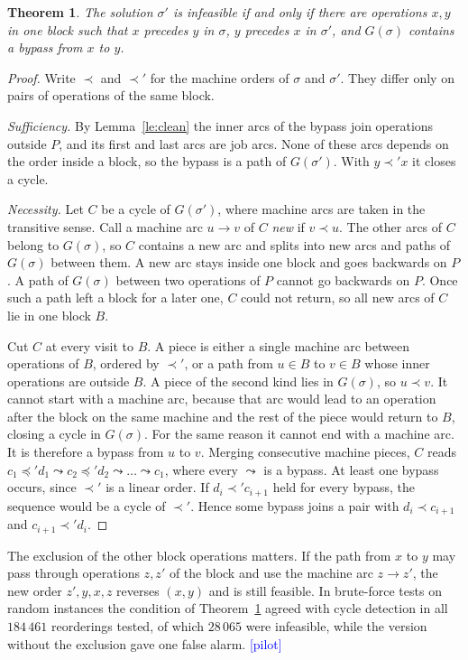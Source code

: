 \documentclass[10pt,twocolumn]{article}
\newtheorem{theorem}{Theorem}
\newcommand{\pilot}{\textcolor{blue}{[pilot]}}
\begin{document}
\begin{theorem}\label{th:main}
The solution $\sigma'$ is infeasible if and only if there are operations
$x,y$ in one block such that $x$ precedes $y$ in $\sigma$, $y$ precedes
$x$ in $\sigma'$, and $G(\sigma)$ contains a bypass from $x$ to $y$.
\end{theorem}
\begin{proof}
Write $\prec$ and $\prec'$ for the machine orders of $\sigma$ and
$\sigma'$. They differ only on pairs of operations of the same block.

\emph{Sufficiency.} By Lemma~\ref{le:clean} the inner arcs of the bypass
join operations outside $P$, and its first and last arcs are job arcs.
None of these arcs depends on the order inside a block, so the bypass is a
path of $G(\sigma')$. With $y\prec' x$ it closes a cycle.

\emph{Necessity.} Let $C$ be a cycle of $G(\sigma')$, where machine arcs
are taken in the transitive sense. Call a machine arc $u\to v$ of $C$
\emph{new} if $v\prec u$. The other arcs of $C$ belong to $G(\sigma)$, so
$C$ contains a new arc and splits into new arcs and paths of $G(\sigma)$
between them. A new arc stays inside one block and goes backwards on $P$.
A path of $G(\sigma)$ between two operations of $P$ cannot go backwards on
$P$. Once such a path left a block for a later one, $C$ could not return,
so all new arcs of $C$ lie in one block $B$.

Cut $C$ at every visit to $B$. A piece is either a single machine arc
between operations of $B$, ordered by $\prec'$, or a path from $u\in B$ to
$v\in B$ whose inner operations are outside $B$. A piece of the second
kind lies in $G(\sigma)$, so $u\prec v$. It cannot start with a machine
arc, because that arc would lead to an operation after the block on the
same machine and the rest of the piece would return to $B$, closing a
cycle in $G(\sigma)$. For the same reason it cannot end with a machine
arc. It is therefore a bypass from $u$ to $v$. Merging consecutive machine
pieces, $C$ reads
$c_1\preceq' d_1\leadsto c_2\preceq' d_2\leadsto\dots\leadsto c_1$, where
every $\leadsto$ is a bypass. At least one bypass occurs, since $\prec'$
is a linear order. If $d_i\prec' c_{i+1}$ held for every bypass, the
sequence would be a cycle of $\prec'$. Hence some bypass joins a pair with
$d_i\prec c_{i+1}$ and $c_{i+1}\prec' d_i$.
\end{proof}

The exclusion of the other block operations matters. If the path from $x$
to $y$ may pass through operations $z,z'$ of the block and use the machine
arc $z\to z'$, the new order $z',y,x,z$ reverses $(x,y)$ and is still
feasible. In brute-force tests on random instances the condition of
Theorem~\ref{th:main} agreed with cycle detection in all $184\,461$
reorderings tested, of which $28\,065$ were infeasible, while the version
without the exclusion gave one false alarm. \pilot
\end{document}
